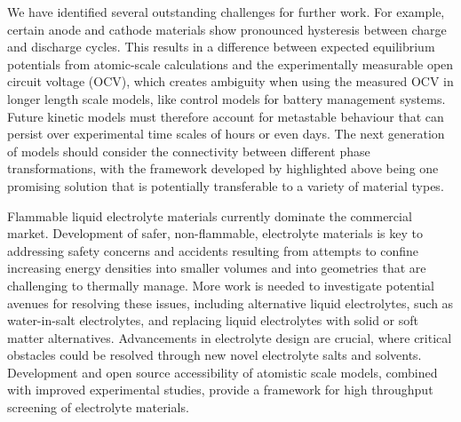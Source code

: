 \documentclass[../main.tex]{subfiles}
\begin{document}
We have identified several outstanding challenges for further work. For example, certain anode and cathode materials show pronounced hysteresis between charge and discharge cycles. \cite{Liu2014,Assat2019,Mercer2021,Grismann2017,Zheng1996,Jiang_2020} This results in a difference between expected equilibrium potentials from atomic-scale calculations and the experimentally measurable open circuit voltage (OCV), which creates ambiguity when using the measured OCV in longer length scale models, like control models for battery management systems. Future kinetic models must therefore account for metastable behaviour that can persist over experimental time scales of hours or even days.\cite{Liu2014} The next generation of models should consider the connectivity between different phase transformations, with the framework developed by \citeauthor{VanderVen2020} highlighted above being one promising solution that is potentially transferable to a variety of material types.

Flammable liquid electrolyte materials currently dominate the commercial market. Development of safer, non-flammable, electrolyte materials is key to addressing safety concerns and accidents resulting from attempts to confine increasing energy densities into smaller volumes and into geometries that are challenging to thermally manage. More work is needed to investigate potential avenues for resolving these issues, including alternative liquid electrolytes,\cite{Shepherd_Siddiqui, McCurry_2017, Pfrang2017} such as water-in-salt electrolytes,\cite{suo2015water,chen2020water} and replacing liquid electrolytes with solid or soft matter alternatives.\cite{Woods_2021,kim2021solid} Advancements in electrolyte design are crucial, where critical obstacles could be resolved through new novel electrolyte salts and solvents. Development and open source accessibility of atomistic scale models, combined with improved experimental studies, provide a framework for high throughput screening of electrolyte materials.\cite{merlet_highly_2013, borodin_interfacial_2014, Simoncelli_2018,marin-lafleche_metalwalls_2020}
\end{document}
